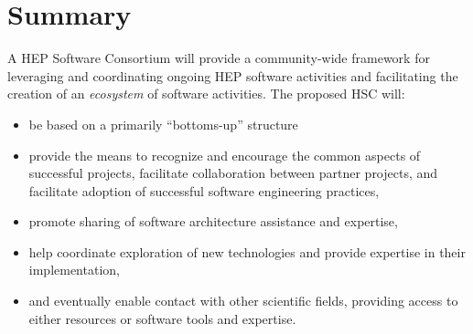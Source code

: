 \documentclass[12pt,letterpaper,fleqn]{article}
\begin{document}
%


\section{Summary} 

A HEP Software Consortium will provide a community-wide framework
for leveraging and coordinating ongoing HEP software activities and facilitating the creation of an {\it ecosystem} of software activities.   The proposed HSC will:
\begin{itemize}
\item be based on a primarily ``bottoms-up'' structure
\item provide the means to recognize and encourage the common aspects
of successful projects, facilitate collaboration between partner
projects, and facilitate adoption of successful software engineering
practices,
\item promote sharing of software architecture assistance and expertise,
\item help coordinate exploration of new technologies and provide expertise in their implementation,
\item and eventually enable contact with other scientific fields,
providing access to either resources or software tools and expertise.
\end{itemize}



\newpage

%
%
\end{document}
